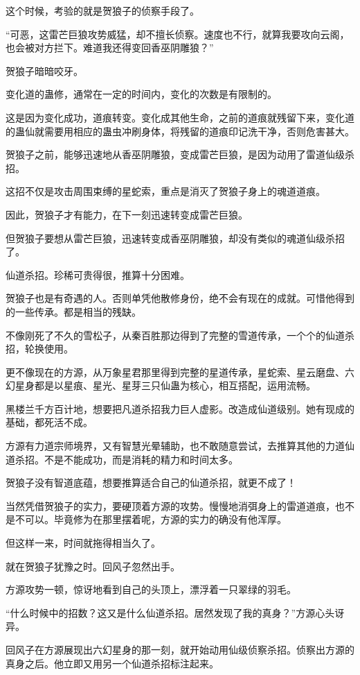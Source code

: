 \begin{this_body}
这个时候，考验的就是贺狼子的侦察手段了。

“可恶，这雷芒巨狼攻势威猛，却不擅长侦察。速度也不行，就算我要攻向云阁，也会被对方拦下。难道我还得变回香巫阴雕狼？”

贺狼子暗暗咬牙。

变化道的蛊修，通常在一定的时间内，变化的次数是有限制的。

这是因为变化成功，道痕转变。变化成其他生命，之前的道痕就残留下来，变化道的蛊仙就需要用相应的蛊虫冲刷身体，将残留的道痕印记洗干净，否则危害甚大。

贺狼子之前，能够迅速地从香巫阴雕狼，变成雷芒巨狼，是因为动用了雷道仙级杀招。

这招不仅是攻击周围束缚的星蛇索，重点是消灭了贺狼子身上的魂道道痕。

因此，贺狼子才有能力，在下一刻迅速转变成雷芒巨狼。

但贺狼子要想从雷芒巨狼，迅速转变成香巫阴雕狼，却没有类似的魂道仙级杀招了。

仙道杀招。珍稀可贵得很，推算十分困难。

贺狼子也是有奇遇的人。否则单凭他散修身份，绝不会有现在的成就。可惜他得到的一些传承。都是相当的残缺。

不像刚死了不久的雪松子，从秦百胜那边得到了完整的雪道传承，一个个的仙道杀招，轮换使用。

更不像现在的方源，从万象星君那里得到完整的星道传承，星蛇索、星云磨盘、六幻星身都是以星痕、星光、星芽三只仙蛊为核心，相互搭配，运用流畅。

黑楼兰千方百计地，想要把凡道杀招我力巨人虚影。改造成仙道级别。她有现成的基础，都死活不成。

方源有力道宗师境界，又有智慧光晕辅助，也不敢随意尝试，去推算其他的力道仙道杀招。不是不能成功，而是消耗的精力和时间太多。

贺狼子没有智道底蕴，想要推算适合自己的仙道杀招，就更不成了！

当然凭借贺狼子的实力，要硬顶着方源的攻势。慢慢地消弭身上的雷道道痕，也不是不可以。毕竟修为在那里摆着呢，方源的实力的确没有他浑厚。

但这样一来，时间就拖得相当久了。

就在贺狼子犹豫之时。回风子忽然出手。

方源攻势一顿，惊讶地看到自己的头顶上，漂浮着一只翠绿的羽毛。

“什么时候中的招数？这又是什么仙道杀招。居然发现了我的真身？”方源心头讶异。

回风子在方源展现出六幻星身的那一刻，就开始动用仙级侦察杀招。侦察出方源的真身之后。他立即又用另一个仙道杀招标注起来。


\end{this_body}
